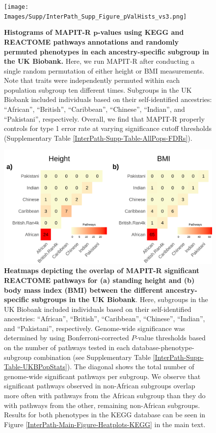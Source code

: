 \documentclass[10pt]{article}
\begin{document}
\begin{figure}[htbp]
\centering
\vspace*{-2cm}
\texttt{[image: Images/Supp/InterPath\_Supp\_Figure\_pValHists\_vs3.png]}
\caption{\textbf{Histograms of MAPIT-R $\bm{p}$-values using KEGG and REACTOME pathways annotations and randomly permuted phenotypes in each ancestry-specific subgroup in the UK Biobank.} Here, we run MAPIT-R after conducting a single random permutation of either height or BMI measurements. Note that traits were independently permuted within each population subgroup ten different times. Subgroups in the UK Biobank included individuals based on their self-identified ancestries: ``African'', ``British'', ``Caribbean'', ``Chinese'', ``Indian'', and ``Pakistani'', respectively. Overall, we find that MAPIT-R properly controls for type 1 error rate at varying significance cutoff thresholds (Supplementary Table \ref{InterPath-Supp-Table-AllPops-FDRs}).}
\label{InterPath-Supp-Figure-10perms-pValHists}
\end{figure}
\clearpage
\setlength{\footskip}{1cm}

\setlength{\footskip}{1cm}
\begin{figure}[htbp]
\centering
\includegraphics[width = \textwidth]{Images/Supp/InterPath_Supp_Figure_Heatplots_REACTOME_vs4.png}
\caption{\textbf{Heatmaps depicting the overlap of MAPIT-R significant REACTOME pathways for (a) standing height and (b) body mass index (BMI) between the different ancestry-specific subgroups in the UK Biobank}. Here, subgroups in the UK Biobank included individuals based on their self-identified ancestries: ``African'', ``British'', ``Caribbean'', ``Chinese'', ``Indian'', and ``Pakistani'', respectively. Genome-wide significance was determined by using Bonferroni-corrected $P$-value thresholds based on the number of pathways tested in each database-phenotype-subgroup combination (see Supplementary Table \ref{InterPath-Supp-Table-UKBPopStats}). The diagonal shows the total number of genome-wide significant pathways per subgroup. We observe that significant pathways observed in non-African subgroups overlap more often with pathways from the African subgroup than they do with pathways from the other, remaining non-African subgroups. Results for both phenotypes in the KEGG database can be seen in Figure \ref{InterPath-Main-Figure-Heatplots-KEGG} in the main text.}
\label{InterPath-Supp-Figure-Heatplots-REACTOME}
\end{figure}
\clearpage
\setlength{\footskip}{1cm}
\end{document}
